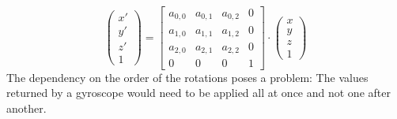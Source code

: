 \begin{equation*}
    \begin{pmatrix}
    x'  \\
    y'  \\
    z'  \\
    1
    \end{pmatrix} 
    = 
    \begin{bmatrix}
a_{0,0} & a_{0,1} & a_{0,2} & 0 \\
a_{1,0} & a_{1,1} & a_{1,2} & 0 \\
a_{2,0} & a_{2,1} & a_{2,2} & 0 \\
0 & 0 & 0 & 1
\end{bmatrix}
\cdot 
\begin{pmatrix}
    x  \\
    y  \\
    z  \\
    1
    \end{pmatrix}
\end{equation*}
The dependency on the order of the rotations poses a problem: The values returned by a gyroscope would need to be applied all at once and not one after another. 